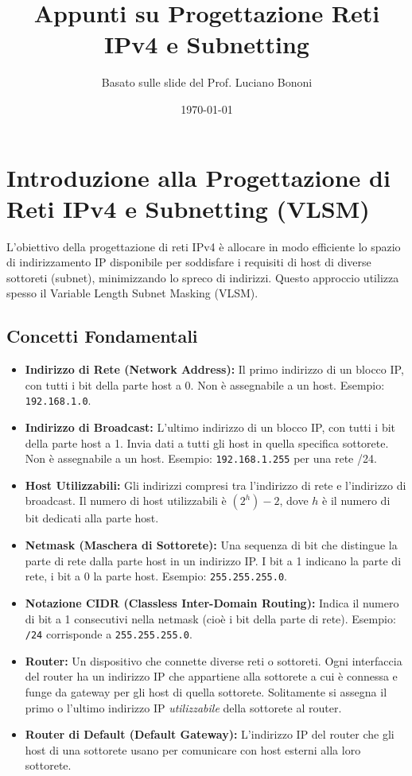 

\title{Appunti su Progettazione Reti IPv4 e Subnetting}
\author{Basato sulle slide del Prof. Luciano Bononi}
\date{\today}



\maketitle
\tableofcontents
\newpage

\section{Introduzione alla Progettazione di Reti IPv4 e Subnetting (VLSM)}
L'obiettivo della progettazione di reti IPv4 è allocare in modo efficiente lo spazio di indirizzamento IP disponibile per soddisfare i requisiti di host di diverse sottoreti (subnet), minimizzando lo spreco di indirizzi. Questo approccio utilizza spesso il Variable Length Subnet Masking (VLSM).

\subsection{Concetti Fondamentali}
\begin{itemize}
    \item \textbf{Indirizzo di Rete (Network Address):} Il primo indirizzo di un blocco IP, con tutti i bit della parte host a 0. Non è assegnabile a un host. Esempio: \texttt{192.168.1.0}.
    \item \textbf{Indirizzo di Broadcast:} L'ultimo indirizzo di un blocco IP, con tutti i bit della parte host a 1. Invia dati a tutti gli host in quella specifica sottorete. Non è assegnabile a un host. Esempio: \texttt{192.168.1.255} per una rete /24.
    \item \textbf{Host Utilizzabili:} Gli indirizzi compresi tra l'indirizzo di rete e l'indirizzo di broadcast. Il numero di host utilizzabili è $(2^h) - 2$, dove $h$ è il numero di bit dedicati alla parte host.
    \item \textbf{Netmask (Maschera di Sottorete):} Una sequenza di bit che distingue la parte di rete dalla parte host in un indirizzo IP. I bit a 1 indicano la parte di rete, i bit a 0 la parte host. Esempio: \texttt{255.255.255.0}.
    \item \textbf{Notazione CIDR (Classless Inter-Domain Routing):} Indica il numero di bit a 1 consecutivi nella netmask (cioè i bit della parte di rete). Esempio: \texttt{/24} corrisponde a \texttt{255.255.255.0}.
    \item \textbf{Router:} Un dispositivo che connette diverse reti o sottoreti. Ogni interfaccia del router ha un indirizzo IP che appartiene alla sottorete a cui è connessa e funge da gateway per gli host di quella sottorete. Solitamente si assegna il primo o l'ultimo indirizzo IP \textit{utilizzabile} della sottorete al router.
    \item \textbf{Router di Default (Default Gateway):} L'indirizzo IP del router che gli host di una sottorete usano per comunicare con host esterni alla loro sottorete.
\end{itemize}

